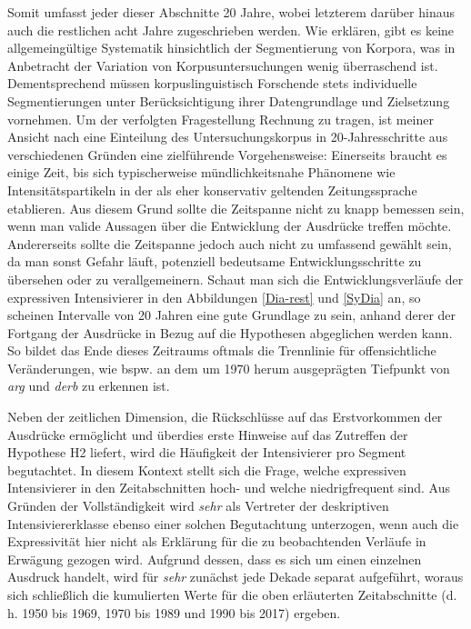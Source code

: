 \noindent Somit umfasst jeder dieser Abschnitte 20 Jahre, wobei letzterem darüber hinaus auch die restlichen acht Jahre zugeschrieben werden. Wie \citet[97]{Perkuhn.2012} erklären, gibt es keine allgemeingültige Systematik hinsichtlich der Segmentierung von Korpora, was in Anbetracht der Variation von Korpusuntersuchungen wenig überraschend ist. Dementsprechend müssen korpuslinguistisch Forschende stets individuelle Segmentierungen unter Berücksichtigung ihrer Datengrundlage und Zielsetzung vornehmen. Um der verfolgten Fragestellung Rechnung zu tragen, ist meiner Ansicht nach eine Einteilung des Untersuchungskorpus in 20-Jahresschritte aus verschiedenen Gründen eine zielführende Vorgehensweise: Einerseits braucht es einige Zeit, bis sich typischerweise mündlichkeitsnahe Phänomene wie Intensitätspartikeln in der als eher konservativ geltenden Zeitungssprache etablieren. Aus diesem Grund sollte die Zeitspanne nicht zu knapp bemessen sein, wenn man valide Aussagen über die Entwicklung der Ausdrücke treffen möchte. Andererseits sollte die Zeitspanne jedoch auch nicht zu umfassend gewählt sein, da man sonst Gefahr läuft, potenziell bedeutsame Entwicklungsschritte zu übersehen oder zu verallgemeinern. Schaut man sich die Entwicklungsverläufe der expressiven Intensivierer in den Abbildungen \ref{Dia-rest} und \ref{SyDia} an, so scheinen Intervalle von 20 Jahren eine gute Grundlage zu sein, anhand derer der Fortgang der Ausdrücke in Bezug auf die Hypothesen abgeglichen werden kann. So bildet das Ende dieses Zeitraums oftmals die Trennlinie für offensichtliche Veränderungen, wie bspw. an dem um 1970 herum ausgeprägten Tiefpunkt von \textit{arg} und \textit{derb} zu erkennen ist.

Neben der zeitlichen Dimension, die Rückschlüsse auf das Erstvorkommen der Ausdrücke ermöglicht und überdies erste Hinweise auf das Zutreffen der Hypothese H2 liefert, wird die Häufigkeit der Intensivierer pro Segment begutachtet. In diesem Kontext stellt sich die Frage, welche expressiven Intensivierer in den Zeitabschnitten hoch- und welche niedrigfrequent sind. Aus Gründen der Vollständigkeit wird \textit{sehr} als Vertreter der deskriptiven Intensiviererklasse ebenso einer solchen Begutachtung unterzogen, wenn auch die Expressivität hier nicht als Erklärung für die zu beobachtenden Verläufe in Erwägung gezogen wird. Aufgrund dessen, dass es sich um einen einzelnen Ausdruck handelt, wird für \textit{sehr} zunächst jede Dekade separat aufgeführt, woraus sich schließlich die kumulierten Werte für die oben erläuterten Zeitabschnitte (d.\,h. 1950 bis 1969, 1970 bis 1989 und 1990 bis 2017) ergeben.

